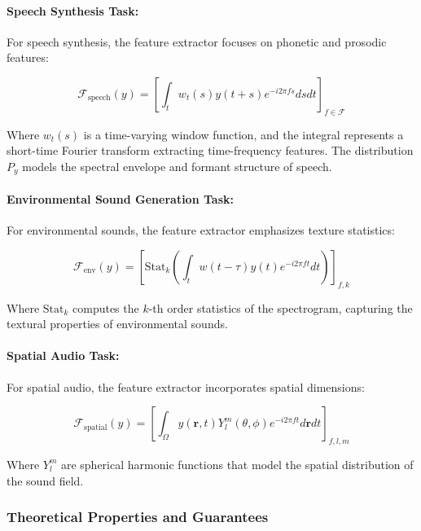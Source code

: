 \paragraph{Speech Synthesis Task:}
For speech synthesis, the feature extractor focuses on phonetic and prosodic features:

\begin{equation}
\mathcal{F}_{\text{speech}}(y) = \left[ \int_t w_t(s) y(t+s) e^{-i2\pi fs} dsdt \right]_{f \in \mathcal{F}}
\end{equation}

Where $w_t(s)$ is a time-varying window function, and the integral represents a short-time Fourier transform extracting time-frequency features. The distribution $P_y$ models the spectral envelope and formant structure of speech.

\paragraph{Environmental Sound Generation Task:}
For environmental sounds, the feature extractor emphasizes texture statistics:

\begin{equation}
\mathcal{F}_{\text{env}}(y) = \left[ \text{Stat}_k\left( \int_t w(t-\tau) y(t) e^{-i2\pi f t} dt \right) \right]_{f,k}
\end{equation}

Where $\text{Stat}_k$ computes the $k$-th order statistics of the spectrogram, capturing the textural properties of environmental sounds.

\paragraph{Spatial Audio Task:}
For spatial audio, the feature extractor incorporates spatial dimensions:

\begin{equation}
\mathcal{F}_{\text{spatial}}(y) = \left[ \int_{\Omega} y(\mathbf{r},t) Y_l^m(\theta, \phi) e^{-i2\pi ft} d\mathbf{r}dt \right]_{f,l,m}
\end{equation}

Where $Y_l^m$ are spherical harmonic functions that model the spatial distribution of the sound field.

\subsubsection{Theoretical Properties and Guarantees}

